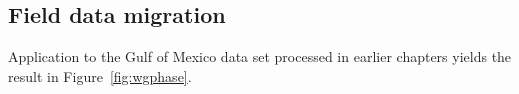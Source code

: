 %

\subsection{Field data migration}
Application %
to the Gulf of Mexico data set processed in earlier chapters
yields the result in Figure~\ref{fig:wgphase}.


